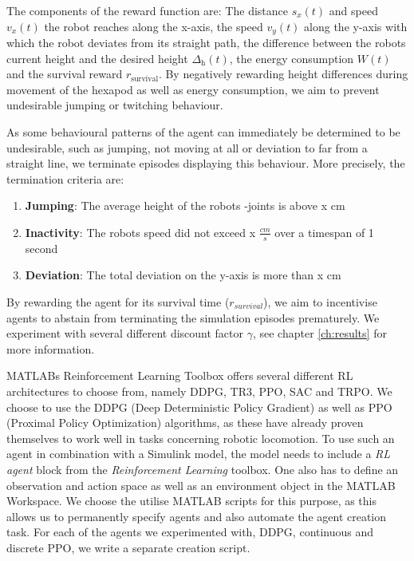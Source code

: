 The components of the reward function are:
The distance $s_x(t)$ and speed $v_x(t)$ the robot reaches along the x-axis, the speed $v_y(t)$ along the y-axis with which the robot deviates from its straight path, the difference between the robots current height and the desired height $\Delta_\text{h}(t)$, the energy consumption $W(t)$ and the survival reward $r_\text{survival}$.
By negatively rewarding height differences during movement of the hexapod as well as energy consumption, we aim to prevent undesirable jumping or twitching behaviour.

As some behavioural patterns of the agent can immediately be determined to be undesirable, such as jumping, not moving at all or deviation to far from a straight line, we terminate episodes displaying this behaviour.
More precisely, the termination criteria are:
\begin{enumerate}
	\item \textbf{Jumping}: The average height of the robots \textalpha-joints is above x cm
	\item \textbf{Inactivity}: The robots speed did not exceed x $\frac{cm}{s}$ over a timespan of 1 second
	\item \textbf{Deviation}: The total deviation on the y-axis is more than x cm
\end{enumerate}
By rewarding the agent for its survival time ($r_{survival}$), we aim to incentivise agents to abstain from terminating the simulation episodes prematurely.
We experiment with several different discount factor $\gamma$, see chapter \ref{ch:results} for more information.



MATLABs Reinforcement Learning Toolbox offers several different RL architectures to choose from, namely DDPG, TR3, PPO, SAC and TRPO.
We choose to use the DDPG (Deep Deterministic Policy Gradient) as well as PPO (Proximal Policy Optimization) algorithms, as these have already proven themselves to work well in tasks concerning robotic locomotion\parencite{FIND AUTHOR}.
To use such an agent in combination with a Simulink model, the model needs to include a \textit{RL agent} block from the \textit{Reinforcement Learning} toolbox.
One also has to define an observation and action space as well as an environment object in the MATLAB Workspace.
We choose the utilise MATLAB scripts for this purpose, as this allows us to permanently specify agents and also automate the agent creation task.
For each of the agents we experimented with, DDPG, continuous and discrete PPO, we write a separate creation script.

